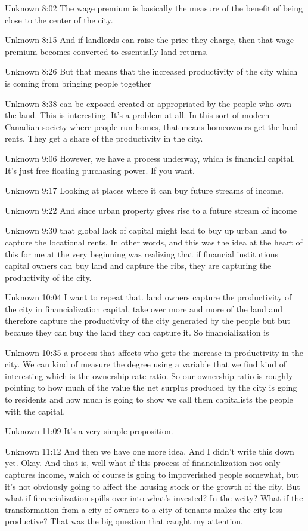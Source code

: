 Unknown 8:02
The wage premium is basically the measure of the benefit of being close to the center of the city.

Unknown 8:15
And if landlords can raise the price they charge, then that wage premium becomes converted to essentially land returns.

Unknown 8:26
But that means that the increased productivity of the city which is coming from bringing people together

Unknown 8:38
can be exposed created or appropriated by the people who own the land. This is interesting. It's a problem at all. In this sort of modern Canadian society where people run homes, that means homeowners get the land rents. They get a share of the productivity in the city.

Unknown 9:06
However, we have a process underway, which is financial capital. It's just free floating purchasing power. If you want.

Unknown 9:17
Looking at places where it can buy future streams of income.

Unknown 9:22
And since urban property gives rise to a future stream of income

Unknown 9:30
that global lack of capital might lead to buy up urban land to capture the locational rents. In other words, and this was the idea at the heart of this for me at the very beginning was realizing that if financial institutions capital owners can buy land and capture the ribs, they are capturing the productivity of the city.

Unknown 10:04
I want to repeat that. land owners capture the productivity of the city in financialization capital, take over more and more of the land and therefore capture the productivity of the city generated by the people but but because they can buy the land they can capture it. So financialization is

Unknown 10:35
a process that affects who gets the increase in productivity in the city. We can kind of measure the degree using a variable that we find kind of interesting which is the ownership rate ratio. So our ownership ratio is roughly pointing to how much of the value the net surplus produced by the city is going to residents and how much is going to show we call them capitalists the people with the capital.

Unknown 11:09
It's a very simple proposition.

Unknown 11:12
And then we have one more idea. And I didn't write this down yet. Okay. And that is, well what if this process of financialization not only captures income, which of course is going to impoverished people somewhat, but it's not obviously going to affect the housing stock or the growth of the city. But what if financialization spills over into what's invested? In the wcity? What if the transformation from a city of owners to a city of tenants makes the city less productive? That was the big question that caught my attention.

